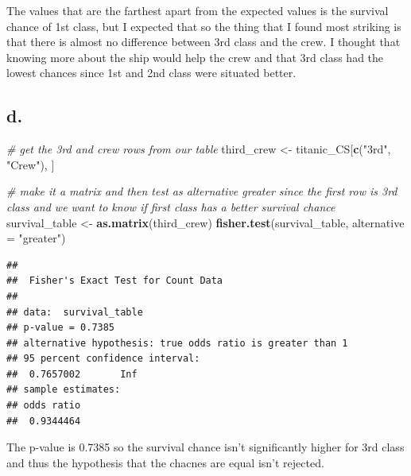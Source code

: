 \documentclass[
]{article}
\newenvironment{Shaded}{\begin{snugshade}}{\end{snugshade}}
\newcommand{\AttributeTok}[1]{\textcolor[rgb]{0.13,0.29,0.53}{#1}}
\newcommand{\CommentTok}[1]{\textcolor[rgb]{0.56,0.35,0.01}{\textit{#1}}}
\newcommand{\FunctionTok}[1]{\textcolor[rgb]{0.13,0.29,0.53}{\textbf{#1}}}
\newcommand{\NormalTok}[1]{#1}
\newcommand{\OtherTok}[1]{\textcolor[rgb]{0.56,0.35,0.01}{#1}}
\newcommand{\StringTok}[1]{\textcolor[rgb]{0.31,0.60,0.02}{#1}}
\begin{document}
The values that are the farthest apart from the expected values is the
survival chance of 1st class, but I expected that so the thing that I
found most striking is that there is almost no difference between 3rd
class and the crew. I thought that knowing more about the ship would
help the crew and that 3rd class had the lowest chances since 1st and
2nd class were situated better.

\subsection{d.}\label{d.-1}

\begin{Shaded}
\begin{Highlighting}[]
\CommentTok{\# get the 3rd and crew rows from our table}
\NormalTok{third\_crew }\OtherTok{\textless{}{-}}\NormalTok{ titanic\_CS[}\FunctionTok{c}\NormalTok{(}\StringTok{"3rd"}\NormalTok{, }\StringTok{"Crew"}\NormalTok{), ]}

\CommentTok{\# make it a matrix and then test as alternative greater since the first row is 3rd class and we want to know if first class has a better survival chance}
\NormalTok{survival\_table }\OtherTok{\textless{}{-}} \FunctionTok{as.matrix}\NormalTok{(third\_crew)}
\FunctionTok{fisher.test}\NormalTok{(survival\_table, }\AttributeTok{alternative =} \StringTok{"greater"}\NormalTok{)}
\end{Highlighting}
\end{Shaded}

\begin{verbatim}
## 
##  Fisher's Exact Test for Count Data
## 
## data:  survival_table
## p-value = 0.7385
## alternative hypothesis: true odds ratio is greater than 1
## 95 percent confidence interval:
##  0.7657002       Inf
## sample estimates:
## odds ratio 
##  0.9344464
\end{verbatim}

The p-value is 0.7385 so the survival chance isn't significantly higher
for 3rd class and thus the hypothesis that the chacnes are equal isn't
rejected.
\end{document}
